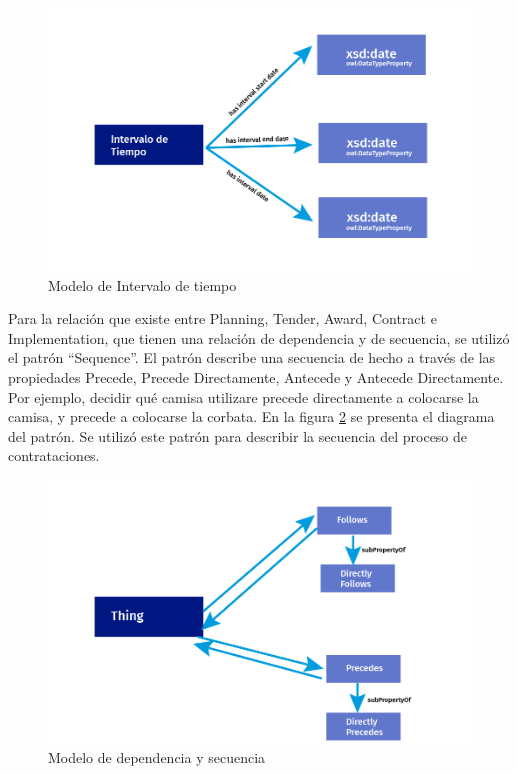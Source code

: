 \begin{figure}[h!]
    \centering
    \includegraphics[width=150mm]{figuras/Diagramas_Tiempo.png}
    \caption{Modelo de Intervalo de tiempo}
    \label{img:Modelo de Intervalo de precio}
    
\end{figure}

Para la relación que existe entre Planning, Tender, Award, Contract e Implementation, que tienen una relación de dependencia y de secuencia, se utilizó el patrón “Sequence”. El patrón describe una secuencia de hecho a través de las propiedades Precede, Precede Directamente, Antecede y Antecede Directamente. Por ejemplo, decidir qué camisa utilizare precede directamente a colocarse la camisa, y precede a colocarse la corbata. En la figura \ref{img:Modelo de dependencia y secuencia} se presenta el diagrama del patrón. Se utilizó este patrón para describir la secuencia del proceso de contrataciones.

\begin{figure}[h!]
    \centering
    \includegraphics[width=150mm]{figuras/Diagramas_Follows.png}
    \caption{Modelo de dependencia y secuencia}
    \label{img:Modelo de dependencia y secuencia}
    
\end{figure}


